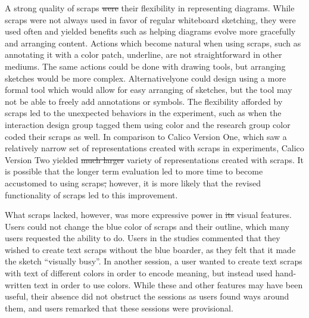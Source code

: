 \documentclass[12pt,fleqn]{ucithesis}
\providecommand{\DIFaddtex}[1]{{\protect\color{blue}\uwave{#1}}} %
\providecommand{\DIFdeltex}[1]{{\protect\color{red}\sout{#1}}}                      %
\providecommand{\DIFaddbegin}{} %
\providecommand{\DIFaddend}{} %
\providecommand{\DIFdelbegin}{} %
\providecommand{\DIFdelend}{} %
\providecommand{\DIFadd}[1]{\texorpdfstring{\DIFaddtex{#1}}{#1}} %
\providecommand{\DIFdel}[1]{\texorpdfstring{\DIFdeltex{#1}}{}} %
\begin{document}
A strong quality of scraps \DIFdelbegin \DIFdel{were }\DIFdelend \DIFaddbegin \DIFadd{was }\DIFaddend their flexibility in representing diagrams. While scraps were not always used in favor of regular whiteboard sketching, they were used often and yielded benefits such as helping diagrams evolve more gracefully and arranging content. Actions which become natural when using scraps, such as annotating it with a color patch, underline, are not straightforward in other mediums. The same actions could be done with drawing tools, but arranging sketches would be more complex. Alternatively\DIFaddbegin \DIFadd{, }\DIFaddend one could design using a more formal tool which would allow for easy arranging of sketches, but the tool may not be able to freely add annotations or symbols. The flexibility afforded by scraps led to the unexpected behaviors in the experiment, such as when the interaction design group tagged them using color and the research group color coded their scraps as well. In comparison to Calico Version One, which saw a relatively narrow set of representations created with scraps in experiments, Calico Version Two yielded \DIFdelbegin \DIFdel{much larger }\DIFdelend \DIFaddbegin \DIFadd{a much greater }\DIFaddend variety of representations created with scraps. It is possible that the longer term evaluation led to more time to become accustomed to using scraps\DIFdelbegin \DIFdel{, }\DIFdelend \DIFaddbegin \DIFadd{; }\DIFaddend however, it is more likely that the revised functionality of scraps led to this improvement.

What scraps lacked, however, was more expressive power in \DIFdelbegin \DIFdel{its }\DIFdelend \DIFaddbegin \DIFadd{their }\DIFaddend visual features. Users could not change the blue color of scraps and their outline, which many users requested the ability to do. Users in the studies commented that they wished to create text scraps without the blue boarder, as they felt that it made the sketch ``visually busy''. In another session, a user wanted to create text scraps with text of different colors in order to encode meaning, but instead used hand-written text in order to use colors. While these and other features may have been useful, their absence did not obstruct the sessions as users found ways around them, and users remarked that these sessions were provisional.
\end{document}
